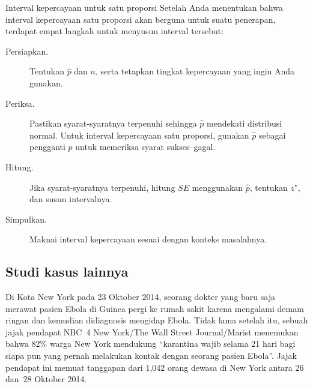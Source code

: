 \newcommand{\onepropconfintsummary}[0]{
\begin{onebox}{Interval kepercayaan untuk satu proporsi}
  Setelah Anda menentukan bahwa interval kepercayaan satu proporsi
  akan berguna untuk suatu penerapan,
  terdapat empat langkah untuk menyusun interval tersebut:
  \begin{description}
  \item[Persiapkan.]
      Tentukan $\hat{p}$ dan $n$, serta tetapkan
      tingkat kepercayaan yang ingin Anda gunakan.
  \item[Periksa.]
      Pastikan syarat-syaratnya terpenuhi sehingga $\hat{p}$
      mendekati distribusi normal.
      Untuk interval kepercayaan satu proporsi,
      gunakan $\hat{p}$ sebagai pengganti $p$ untuk memeriksa
      syarat sukses--gagal.
  \item[Hitung.]
      Jika syarat-syaratnya terpenuhi, hitung $SE$ menggunakan $\hat{p}$,
      tentukan $z^{\star}$, dan susun intervalnya.
  \item[Simpulkan.]
      Maknai interval kepercayaan sesuai dengan konteks
      masalahnya.
  \end{description}
\end{onebox}
}
\onepropconfintsummary{}


 
\subsection{Studi kasus lainnya}


\newcommand{\wsjebolapollsize}{1042}
\newcommand{\wsjebolapollsizecomma}{1,042}
\newcommand{\wsjebolapollprop}{0.82}
\newcommand{\wsjebolapollpropcomplement}{0.18}
\newcommand{\wsjebolapollpercent}{82}
\newcommand{\wsjebolapollpercentcomplement}{18}
\newcommand{\wsjebolapollcount}{854}
\newcommand{\wsjebolapollcountcomplement}{188}
\newcommand{\wsjebolapollse}{0.012}


Di Kota New York pada 23 Oktober 2014, seorang dokter yang baru saja
merawat pasien Ebola di Guinea pergi ke rumah sakit karena mengalami demam ringan
dan kemudian didiagnosis mengidap Ebola. Tidak lama setelah itu,
sebuah jajak pendapat NBC~4 New York/The Wall Street Journal/Marist menemukan bahwa
\wsjebolapollpercent{}\% warga New York mendukung ``karantina wajib selama 21 hari
bagi siapa pun yang pernah melakukan kontak dengan seorang pasien
Ebola''. Jajak pendapat ini memuat tanggapan
dari \wsjebolapollsizecomma{} orang dewasa di New York antara
26 dan~28 Oktober 2014.

